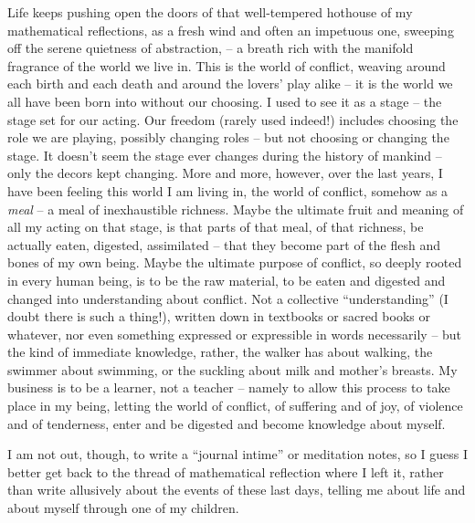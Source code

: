 \label{sec:140}%
Life keeps pushing open the doors of that well-tempered hothouse of my
mathematical reflections, as a fresh wind and often an impetuous one,
sweeping off the serene quietness of abstraction, -- a breath rich
with the manifold fragrance of the world we live in. This is the world
of conflict, weaving around each birth and each death and around the
lovers' play alike -- it is the world we all have been born into
without our choosing. I used to see it as a stage -- the stage set for
our acting. Our freedom (rarely used indeed!) includes choosing the
role we are playing, possibly changing roles -- but not choosing or
changing the stage. It doesn't seem the stage ever changes during the
history of mankind -- only the decors kept changing. More and more,
however, over the last years, I have been feeling this world I am
living in, the world of conflict, somehow as a \emph{meal} -- a meal
of inexhaustible richness. Maybe the ultimate fruit and meaning of all
my acting on that stage, is that parts of that meal, of that richness,
be actually eaten, digested, assimilated -- that they become part of
the flesh and bones of my own being. Maybe the ultimate purpose of
conflict, so deeply rooted in every human being, is to be the raw
material, to be eaten and digested and changed into understanding
about conflict. Not a collective ``understanding'' (I doubt there is
such a thing!), written down in textbooks or sacred books or whatever,
nor even something expressed or expressible in words necessarily --
but the kind of immediate knowledge, rather, the walker has about
walking, the swimmer about swimming, or the suckling about milk and
mother's breasts. My business is to be a learner, not a teacher --
namely to allow this process to take place in my being, letting the
world of conflict, of suffering and of joy, of violence and of
tenderness, enter and be digested and become knowledge about myself.

I am not out, though, to write a ``journal intime'' or meditation
notes, so I guess I better get back to the thread of mathematical
reflection where I left it, rather than write allusively about the
events of these last days, telling me about life and about myself
through one of my children.

\bigbreak

\presectionfill{}\par


